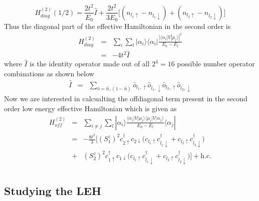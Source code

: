 \documentclass[reprint,prb,superscriptaddress]{revtex4-2}
\begin{document}
\begin{equation}
H^{(2)}_{diag} (1/2) = \frac{2t^2}{E_0} \hat{I} + \frac{2t^2}{3E_0} \bigg[ (n_{l_1\uparrow}-n_{l_1\downarrow}) +(n_{l_2\uparrow}-n_{l_2\downarrow}) \bigg]
\end{equation}
Thus the diagonal part of the effective Hamiltonian in the second order is 
\begin{eqnarray}
H^{(2)}_{diag} &=& \sum_{i} \sum_l |\alpha_i\rangle\langle \alpha_i | \frac{|\langle \alpha_i  | V| \mu_l \rangle|^2 }{E_0-E_{l}} \nonumber\\
&=& -4t^2 \hat{I}
\end{eqnarray}
where $\hat{I}$ is the identity operator made out of all $2^4=16$ possible number operator combinations as shown below
\begin{eqnarray}
\hat{I} &=& \sum_{\hat{o}=\hat{n},(1-\hat{n})} \hat{o}_{l_1,\uparrow}\hat{o}_{l_1,\downarrow} \hat{o}_{l_2,\uparrow}\hat{o}_{l_2,\downarrow}
\end{eqnarray}
Now we are interested in calcualting the offdiagonal term present in the second order low energy effective Hamiltonian which is given as
\begin{eqnarray}
H^{(2)}_{off} &=& \sum_{i\neq j} \sum_l |\alpha_i\rangle \frac{\langle \alpha_i  | V| \mu_l \rangle \langle \mu_l  | V| \alpha_j \rangle}{E_0-E_{l}}\langle \alpha_j | \nonumber\\
&=& -\frac{8t^2}{3} \bigg[ (S_1^z)^2 c_{2\uparrow}^{\dagger}c_{2\downarrow} \bigg(  c_{l_1\uparrow}c_{l_1\downarrow}^{\dagger} +  c_{l_2\uparrow}c_{l_2\downarrow}^{\dagger} \bigg) \nonumber\\
&+& (S_2^z)^2 c_{1\uparrow}^{\dagger}c_{1\downarrow} \bigg(  c_{l_1\uparrow}c_{l_1\downarrow}^{\dagger} +  c_{l_2\uparrow}c_{l_2\downarrow}^{\dagger} \bigg)\bigg] + \textrm{h.c.} \nonumber\\
\label{eq:hamiltonian_NFL}
\end{eqnarray}
\subsection{Studying the LEH}
\end{document}
